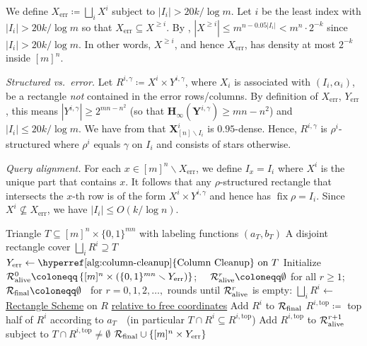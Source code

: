 \documentclass{toc}
\newcommand{\rectscheme}{\hyperref[alg:partition]{Rectangle Scheme}\xspace}
\newcommand{\columnclean}{\hyperref[alg:column-cleanup]{Column Cleanup}\xspace}
\newcommand{\Hmin}{\mathbf{H}_\infty}
\DeclareMathOperator{\fix}{fix}
\DeclareMathOperator{\err}{err}
\newcommand{\X}{\bm{X}}
\newcommand{\Y}{\bm{Y}}
\newcommand{\calR}{\mathcal{R}}
\newcommand{\allX}{[m]^n}
\newcommand{\allY}{\{0,1\}^{mn}}
\newcommand{\set}[1]{\left \{ #1 \right \}}
\newcommand{\alive}{\text{\upshape alive}}
\newcommand{\final}{\text{\upshape final}}
\newcommand{\topp}{\text{top}}
\begin{document}
We define $X_{\err} \coloneqq \bigsqcup_i X^i$ subject to $|I_i| > 20 k/\log m$. Let $i$ be the least index with $|I_{i}| > 20k/\log m$ so that $X_{\err} \subseteq X^{\geqslant i}$. By , $|X^{\geqslant i}| \le m^{n - 0.05 |I_i|} < m^{n} \cdot 2^{-k}$ since $|I_i| > 20 k /\log m$. In other words, $X^{\geqslant i}$, and hence $X_{\err}$, has density at most $2^{-k}$ inside $\allX$.
	
\medskip\noindent
\emph{Structured vs.\ error.}
Let $R^{i,\gamma}\coloneqq X^i\times Y^{i,\gamma}$, where $X_i$ is associated with $(I_i,\alpha_i)$, be a rectangle \emph{not} contained in the error rows/columns. By definition of $X_{\err}$, $Y_{\err}$, this means $|Y^{i,\gamma}| \ge 2^{mn-n^2}$ (so that $\Hmin(\Y^{i,\gamma})\geq mn-n^2$) and $|I_i| \le 20 k/\log m$. We have from  that $\X^i_{[n] \smallsetminus {I_i}}$ is $0.95$-dense. Hence, $R^{i,\gamma}$ is $\rho^i$-structured where $\rho^i$ equals $\gamma$ on $I_i$ and consists of stars otherwise.

\medskip\noindent
\emph{Query alignment.}
For each $x \in \allX \smallsetminus X_{\err}$, we define $I_x = I_i$ where $X^i$ is the unique part that contains $x$. It follows that any $\rho$-structured rectangle that intersects the $x$-th row is of the form $X^i \times Y^{i,\gamma}$ and hence has $\fix \rho = I_i$. Since $X^i \not\subseteq X_{\err}$, we have $|I_i| \le O(k/\log n)$.


\begin{algorithm}[t]
	\begin{algorithmic}[1]
		\vspace{1mm}
		\Input Triangle $T \subseteq \allX \times \allY$ with labeling functions $(a_T, b_T)$
		\Output A disjoint rectangle cover $\bigsqcup_i R^i\supseteq T$
		\vspace{4mm}
		\State $Y_{\err} \gets \text{\columnclean on } T$
		\State Initialize~ $\calR^0_{\alive} \coloneqq \set{\allX \times (\allY \smallsetminus Y_{\err})}$;~~ $\calR^r_{\alive} \coloneqq \emptyset$ for all $r\geq 1$;~~ $\calR_{\final} \coloneqq  \emptyset$
		\vspace{2mm}
		\Loop ~for $r=0,1,2,\ldots,$ rounds until $\calR^r_{\alive}$ is empty:
		\ForAll {$R \in \calR^r_{\alive}$}
		\State $\bigsqcup_i R^i \gets$ \rectscheme on $R$ \underline{relative to free coordinates}
			\State Add $R^i$ to $\calR_{\final}$
		\Else 
		\State
			$R^{i,\topp} \coloneqq $ top half of $R^i$ according to $a_T$~~(in particular $T\cap R^i\subseteq R^{i,\topp}$)
		\State Add $R^{i,\topp}$ to $\calR^{r+1}_{\alive}$ subject to $T \cap R^{i,\topp} \ne \emptyset$
		\EndIf
		\EndFor
		\EndFor
		\EndLoop
		\vspace{1.5mm}
		\State \Return $\calR_{\final} \cup \set{\allX \times Y_{\err}}$
	\end{algorithmic}
	\caption{}
	\label{alg:tri-partition}
\end{algorithm}
\end{document}

